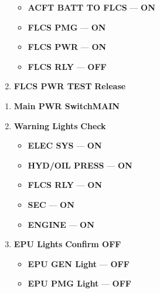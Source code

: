 \begin{checklistenumerate}
\begin{enumerate}
        \begin{itemize}
            \item \textbf{ACFT BATT TO FLCS} --- \textbf{ON}
            \item \textbf{FLCS PMG} --- \textbf{ON}
            \item \textbf{FLCS PWR} --- \textbf{ON}
            \item \textbf{FLCS RLY} --- \textbf{OFF}
        \end{itemize}
        \item \textbf{FLCS PWR TEST} \dotfill \textbf{Release}
    \end{enumerate}
    \begin{enumerate}
        \item \textbf{Main PWR Switch}\cbstart \dotfill \textbf{MAIN}\cbend
        \item \textbf{Warning Lights} \dotfill \textbf{Check}
        \begin{itemize}
            \item \textbf{ELEC SYS} --- \textbf{ON}
            \item \textbf{HYD/OIL PRESS} --- \textbf{ON}
            \item \textbf{FLCS RLY} --- \textbf{ON}
            \item \textbf{SEC} --- \textbf{ON}
            \item \textbf{ENGINE} --- \textbf{ON}
        \end{itemize}
        \item \textbf{EPU Lights} \dotfill \textbf{Confirm OFF}
        \begin{itemize}
            \item \textbf{EPU GEN Light} --- \textbf{OFF}
            \item \textbf{EPU PMG Light} --- \textbf{OFF}
        \end{itemize}
    \end{enumerate}
\end{checklistenumerate}

\clearpage

